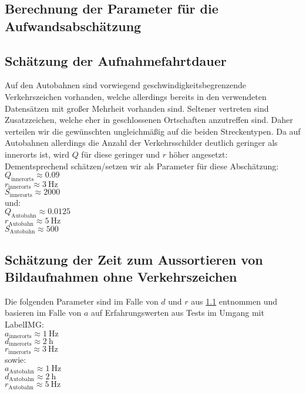 \begin{appendix}
\section{Berechnung der Parameter für die Aufwandsabschätzung}
\subsection{Schätzung der Aufnahmefahrtdauer}
\label{subsec:fahrtdauer}
Auf den Autobahnen sind vorwiegend geschwindigkeitsbegrenzende Verkehrszeichen vorhanden, welche allerdings bereits in den verwendeten Datensätzen mit großer Mehrheit vorhanden sind. Seltener vertreten sind Zusatzzeichen, welche eher in geschlossenen Ortschaften anzutreffen sind. Daher verteilen wir die gewünschten  ungleichmäßig auf die beiden Streckentypen. Da auf Autobahnen allerdings die Anzahl der Verkehrsschilder deutlich geringer als innerorts ist, wird $Q$ für diese geringer und $r$ höher angesetzt:\\\newline
Dementsprechend schätzen/setzen wir als Parameter für diese Abschätzung: \\
$Q_\text{innerorts} \approx 0.09$\\
$r_\text{innerorts} \approx \SI{3}{\hertz}$\\
$S_\text{innerorts} \approx 2000$\\\newline
und:\\\newline
$Q_\text{Autobahn} \approx 0.0125$\\
$r_\text{Autobahn} \approx \SI{5}{\hertz}$\\
$S_\text{Autobahn} \approx 500$\\\newline

\subsection{Schätzung der Zeit zum Aussortieren von Bildaufnahmen ohne Verkehrszeichen}
\label{subsec:aussortieren}
Die folgenden Parameter sind im Falle von $d$ und $r$ aus \cref{subsec:fahrtdauer} entnommen und basieren im Falle von $a$ auf Erfahrungswerten aus Tests im Umgang mit LabelIMG:\\
$a_\text{innerorts} \approx \SI{1}{\hertz}$\\
$d_\text{innerorts} \approx \SI{2}{\hour}$\\
$r_\text{innerorts} \approx \SI{3}{\hertz}$\\\newline
sowie:\\
$a_\text{Autobahn} \approx \SI{1}{\hertz}$\\
$d_\text{Autobahn} \approx \SI{2}{\hour}$\\
$r_\text{Autobahn} \approx \SI{5}{\hertz}$\\\newline


\end{appendix}
